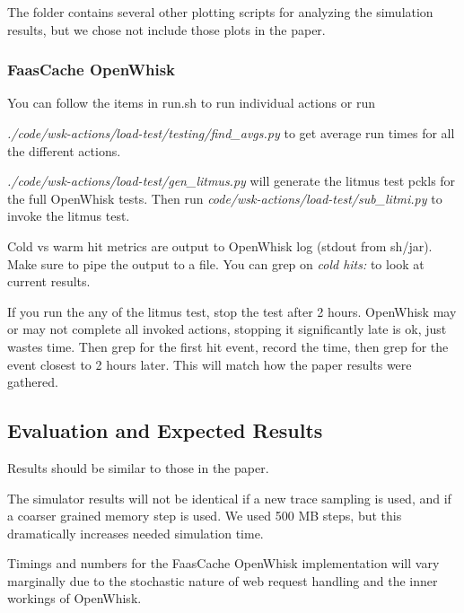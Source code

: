 The folder contains several other plotting scripts for analyzing the simulation results, but we chose not include those plots in the paper.


\subsubsection{FaasCache OpenWhisk}

You can follow the items in run.sh to run individual actions or run 

{\em ./code/wsk-actions/load-test/testing/find\_avgs.py} to get average run times for all the different actions.

{\em ./code/wsk-actions/load-test/gen\_litmus.py} will generate the litmus test pckls for the full OpenWhisk tests.
Then run {\em code/wsk-actions/load-test/sub\_litmi.py} to invoke the litmus test.

Cold vs warm hit metrics are output to OpenWhisk log (stdout from sh/jar). 
Make sure to pipe the output to a file.
You can grep on {\em cold hits:} to look at current results.

If you run the any of the litmus test, stop the test after 2 hours. 
OpenWhisk may or may not complete all invoked actions, stopping it significantly late is ok, just wastes time.
Then grep for the first hit event, record the time, then grep for the event closest to 2 hours later.
This will match how the paper results were gathered.

\subsection{Evaluation and Expected Results}

Results should be similar to those in the paper. 

The simulator results will not be identical if a new trace sampling is used, and if a coarser grained memory step is used. 
We used 500 MB steps, but this dramatically increases needed simulation time. 

Timings and numbers for the FaasCache OpenWhisk implementation will vary marginally due to the stochastic nature of web request handling and the inner workings of OpenWhisk. 




